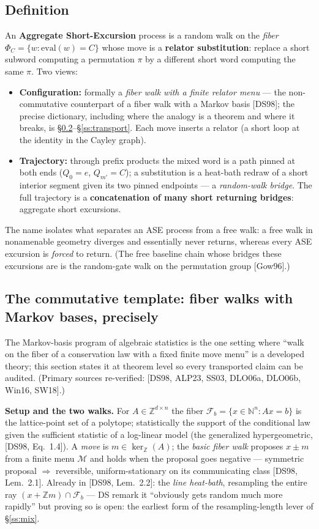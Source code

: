 \documentclass[11pt]{article}
\begin{document}
\subsection{Definition}\label{ss:def}
An \textbf{Aggregate Short-Excursion} process is a random walk on the \emph{fiber}
$\Phi_C=\{w:\mathrm{eval}(w)=C\}$ whose move is a \textbf{relator substitution}: replace a short
subword computing a permutation $\pi$ by a different short word computing the same $\pi$. Two views:
\begin{itemize}
\item \textbf{Configuration:} formally a \emph{fiber walk with a finite relator menu} --- the
non-commutative counterpart of a fiber walk with a Markov basis [DS98]; the precise dictionary,
including where the analogy is a theorem and where it breaks, is \S\ref{ss:markov}--\S\ref{ss:transport}.
Each move inserts a relator (a short loop at the identity in the Cayley graph).
\item \textbf{Trajectory:} through prefix products the mixed word is a path pinned at both ends
($Q_0=e$, $Q_{m'}=C$); a substitution is a heat-bath redraw of a short interior segment given its two
pinned endpoints --- a \emph{random-walk bridge}. The full trajectory is a \textbf{concatenation of
many short returning bridges}: aggregate short excursions.
\end{itemize}
The name isolates what separates an ASE process from a free walk: a free walk in nonamenable geometry
diverges and essentially never returns, whereas every ASE excursion is \emph{forced} to return. (The
free baseline chain whose bridges these excursions are is the random-gate walk on the permutation
group [Gow96].)

\subsection{The commutative template: fiber walks with Markov bases, precisely}\label{ss:markov}
The Markov-basis program of algebraic statistics is the one setting where ``walk on the fiber of a
conservation law with a fixed finite move menu'' is a developed theory; this section states it at
theorem level so every transported claim can be audited. (Primary sources re-verified: [DS98, ALP23,
SS03, DLO06a, DLO06b, Win16, SW18].)

\textbf{Setup and the two walks.} For $A\in\mathbb{Z}^{d\times n}$ the fiber
$\mathcal{F}_b=\{x\in\mathbb{N}^n: Ax=b\}$ is the lattice-point set of a polytope; statistically the
support of the conditional law given the sufficient statistic of a log-linear model (the generalized
hypergeometric, [DS98, Eq.~1.4]). A \emph{move} is $m\in\ker_{\mathbb{Z}}(A)$; the \emph{basic fiber
walk} proposes $x\pm m$ from a finite menu $\mathcal{M}$ and holds when the proposal goes negative ---
symmetric proposal $\Rightarrow$ reversible, uniform-stationary on its communicating class
[DS98, Lem.~2.1]. Already in [DS98, Lem.~2.2]: the \emph{line heat-bath}, resampling the entire ray
$(x+\mathbb{Z}m)\cap\mathcal{F}_b$ --- DS remark it ``obviously gets random much more rapidly'' but
proving so is open: the earliest form of the resampling-length lever of \S\ref{ss:mix}.
\end{document}

